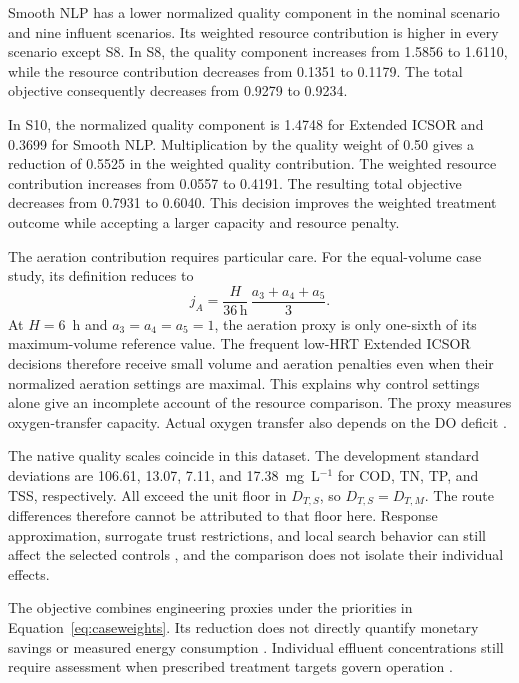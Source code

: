 \documentclass[a4paper,fleqn]{cas-sc}
\begin{document}
Smooth NLP has a lower normalized quality component in the nominal scenario and nine influent scenarios. Its weighted resource contribution is higher in every scenario except S8. In S8, the quality component increases from 1.5856 to 1.6110, while the resource contribution decreases from 0.1351 to 0.1179. The total objective consequently decreases from 0.9279 to 0.9234.

In S10, the normalized quality component is 1.4748 for Extended ICSOR and 0.3699 for Smooth NLP. Multiplication by the quality weight of 0.50 gives a reduction of 0.5525 in the weighted quality contribution. The weighted resource contribution increases from 0.0557 to 0.4191. The resulting total objective decreases from 0.7931 to 0.6040. This decision improves the weighted treatment outcome while accepting a larger capacity and resource penalty.

The aeration contribution requires particular care. For the equal-volume case study, its definition reduces to
\begin{equation}
j_A=
\frac{H}{36\,\mathrm{h}}\,
\frac{a_3+a_4+a_5}{3}.
\label{eq:results-aeration-scaling}
\end{equation}
At $H=6$~h and $a_3=a_4=a_5=1$, the aeration proxy is only one-sixth of its maximum-volume reference value. The frequent low-HRT Extended ICSOR decisions therefore receive small volume and aeration penalties even when their normalized aeration settings are maximal. This explains why control settings alone give an incomplete account of the resource comparison. The proxy measures oxygen-transfer capacity. Actual oxygen transfer also depends on the DO deficit \citep{Zhang2026}.

The native quality scales coincide in this dataset. The development standard deviations are 106.61, 13.07, 7.11, and 17.38~mg~L$^{-1}$ for COD, TN, TP, and TSS, respectively. All exceed the unit floor in $D_{T,S}$, so $D_{T,S}=D_{T,M}$. The route differences therefore cannot be attributed to that floor here. Response approximation, surrogate trust restrictions, and local search behavior can still affect the selected controls \citep{Pedrozo2025,Hameed2026}, and the comparison does not isolate their individual effects.

The objective combines engineering proxies under the priorities in Equation~\eqref{eq:caseweights}. Its reduction does not directly quantify monetary savings or measured energy consumption \citep{Miederer2025,Zhang2026}. Individual effluent concentrations still require assessment when prescribed treatment targets govern operation \citep{Ren2026,Zhang2026}.
\end{document}
